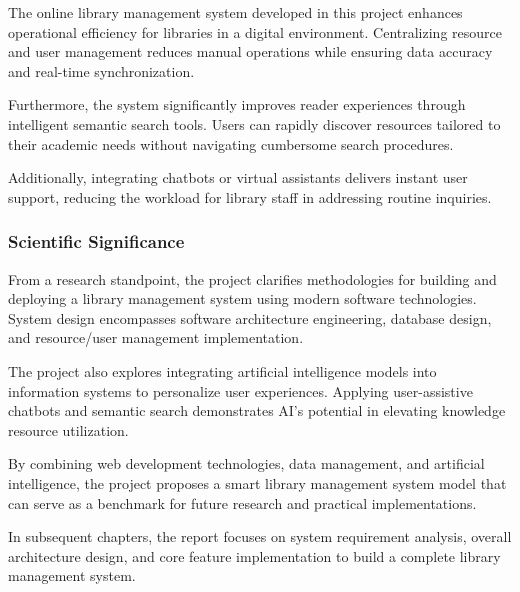 The online library management system developed in this project enhances operational efficiency for libraries in a digital environment. Centralizing resource and user management reduces manual operations while ensuring data accuracy and real-time synchronization.

Furthermore, the system significantly improves reader experiences through intelligent semantic search tools. Users can rapidly discover resources tailored to their academic needs without navigating cumbersome search procedures.

Additionally, integrating chatbots or virtual assistants delivers instant user support, reducing the workload for library staff in addressing routine inquiries.

\subsubsection{Scientific Significance}

From a research standpoint, the project clarifies methodologies for building and deploying a library management system using modern software technologies. System design encompasses software architecture engineering, database design, and resource/user management implementation.

The project also explores integrating artificial intelligence models into information systems to personalize user experiences. Applying user-assistive chatbots and semantic search demonstrates AI's potential in elevating knowledge resource utilization.

By combining web development technologies, data management, and artificial intelligence, the project proposes a smart library management system model that can serve as a benchmark for future research and practical implementations.

In subsequent chapters, the report focuses on system requirement analysis, overall architecture design, and core feature implementation to build a complete library management system.